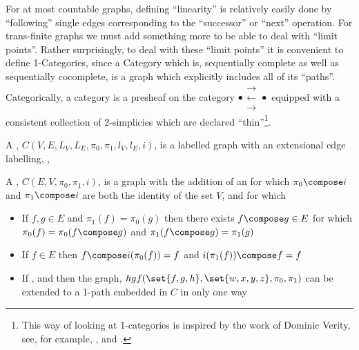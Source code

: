 For at most countable graphs, defining ``linearity'' is relatively easily done by
``following'' single edges corresponding to the ``successor'' or ``next'' operation. For
trans-finite graphs we must add something more to be able to deal with ``limit points''.
Rather surprisingly, to deal with these ``limit points'' it is convenient to define
1-Categories, since a Category which is, sequentially complete as well as sequentially
cocomplete, is a graph which explicitly includes all of its ``paths''. Categorically, a
category is a presheaf on the category
$ \bullet \substack{\mathbf{\longrightarrow} \\[-0.7ex] \mathbf{\longleftarrow} 
\\[-0.7ex] \mathbf{\longrightarrow} } \bullet $
equipped with a consistent collection of 2-simplicies which are declared
``thin''\footnote{This way of looking at 1-categories is inspired by the work of Dominic
Verity, see, for example, \cite{verity2005complicialSets},
\cite{verity2006complicialSimplicialHomotopy} and
\cite{verity2006simplicialComplicialCategories}.}.

\begin{definition}
A , $C(V, E, L_V, L_E, \pi_0, \pi_1, l_V, l_E, i)$, is a labelled graph 
with an extensional edge labelling, , 
\end{definition}


\begin{definition}
A , $C(E, V, \pi_0, \pi_1, i)$, is a graph with the addition of an 
  for which $\pi_0 \compose i$ and $\pi_1 
\compose i$ are both the identity of the set $V$, and for which 
\begin{itemize}
\item If $f, g \in E$ and $\pi_1(f) = \pi_0(g)$ then there exists $f \compose g \in E$ for 
which $ \pi_0(f) = \pi_0(f \compose g)$ and $ \pi_1(f \compose g) = \pi_1(g)$
\item If $f \in E$ then $ f \compose i(\pi_0(f)) = f$ and $i(\pi_1(f)) \compose f = f$
\item If ,  and  then the graph, $hgf(\set{f,
g, h}, \set{w, x, y, z}, \pi_0, \pi_1)$ can be extended to a 1-path embedded in $C$ in only 
one way
\end{itemize}
\end{definition}
